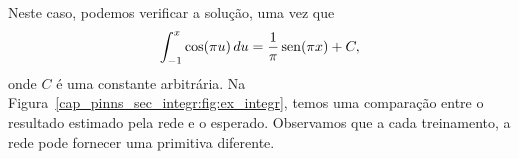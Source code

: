 \begin{ex}
  Neste caso, podemos verificar a solução, uma vez que
  \begin{equation}
    \int_{-1}^{x} \cos(\pi u)\,du = \frac{1}{\pi}\operatorname{sen}(\pi x) + C,
  \end{equation}
  onde $C$ é uma constante arbitrária. Na Figura~\ref{cap_pinns_sec_integr:fig:ex_integr}, temos uma comparação entre o resultado estimado pela rede e o esperado. Observamos que a cada treinamento, a rede pode fornecer uma primitiva diferente.
\end{ex}
